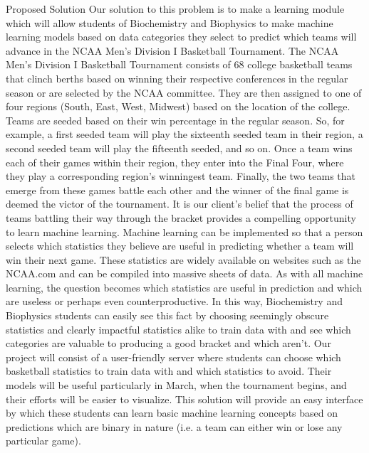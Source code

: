 \documentclass[letterpaper,20pt,titlepage]{article}
\begin{document}
\begin{section}{Proposed Solution}
Our solution to this problem is to make a learning module which will allow students of Biochemistry and Biophysics to make machine learning models based on data categories they select to predict which teams will advance in the NCAA Men’s Division I Basketball Tournament. The NCAA Men’s Division I Basketball Tournament consists of 68 college basketball teams that clinch berths based on winning their respective conferences in the regular season or are selected by the NCAA committee. They are then assigned to one of four regions (South, East, West, Midwest) based on the location of the college. Teams are seeded based on their win percentage in the regular season. So, for example, a first seeded team will play the sixteenth seeded team in their region, a second seeded team will play the fifteenth seeded, and so on. Once a team wins each of their games within their region, they enter into the Final Four, where they play a corresponding region’s winningest team. Finally, the two teams that emerge from these games battle each other and the winner of the final game is deemed the victor of the tournament. It is our client’s belief that the process of teams battling their way through the bracket provides a compelling opportunity to learn machine learning. Machine learning can be implemented so that a person selects which statistics they believe are useful in predicting whether a team will win their next game. These statistics are widely available on websites such as the NCAA.com and can be compiled into massive sheets of data. As with all machine learning, the question becomes which statistics are useful in prediction and which are useless or perhaps even counterproductive. In this way, Biochemistry and Biophysics students can easily see this fact by choosing seemingly obscure statistics and clearly impactful statistics alike to train data with and see which categories are valuable to producing a good bracket and which aren’t. Our project will consist of a user-friendly server where students can choose which basketball statistics to train data with and which statistics to avoid. Their models will be useful particularly in March, when the tournament begins, and their efforts will be easier to visualize. This solution will provide an easy interface by which these students can learn basic machine learning concepts based on predictions which are binary in nature (i.e. a team can either win or lose any particular game).
\end{section}
\end{document}
